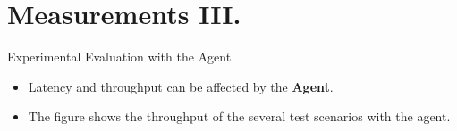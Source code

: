 \documentclass[hyperref={pdfpagelabels=false, unicode},pdf,slideColor,fyma,9pt]{beamer}
\begin{document}
    \section{Measurements III.}
    \begin{frame}{Experimental Evaluation with the Agent}
      \begin{itemize}
          \setlength\itemsep{0.5em}
          \item Latency and throughput can be affected by the \textbf{Agent}.
          \item The figure shows the throughput of the several test scenarios with the agent.
      \end{itemize}
      \begin{figure}[ht]
        \begin{center}
        \end{center}
      \end{figure}
    \end{frame}
\end{document}
